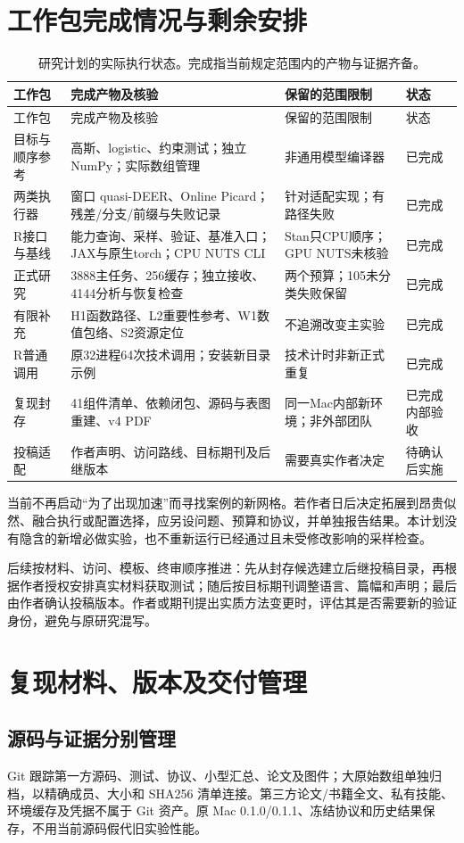 \documentclass[UTF8,zihao=-4,a4paper,fontset=fandol]{ctexart}
\begin{document}
\section{工作包完成情况与剩余安排}
\begin{longtable}{P{24mm}P{57mm}P{39mm}P{25mm}}
\caption{研究计划的实际执行状态。完成指当前规定范围内的产物与证据齐备。}\\
\toprule 工作包 & 完成产物及核验 & 保留的范围限制 & 状态\\\midrule\endfirsthead
\toprule 工作包 & 完成产物及核验 & 保留的范围限制 & 状态\\\midrule\endhead
目标与顺序参考 & 高斯、logistic、约束测试；独立 NumPy；实际数组管理 & 非通用模型编译器 & 已完成\\
两类执行器 & 窗口 quasi-DEER、Online Picard；残差/分支/前缀与失败记录 & 针对适配实现；有路径失败 & 已完成\\
R接口与基线 & 能力查询、采样、验证、基准入口；JAX与原生torch；CPU NUTS CLI & Stan只CPU顺序；GPU NUTS未核验 & 已完成\\
正式研究 & 3888主任务、256缓存；独立接收、4144分析与恢复检查 & 两个预算；105未分类失败保留 & 已完成\\
有限补充 & H1函数路径、L2重要性参考、W1数值包络、S2资源定位 & 不追溯改变主实验 & 已完成\\
R普通调用 & 原32进程64次技术调用；安装新目录示例 & 技术计时非新正式重复 & 已完成\\
复现封存 & 41组件清单、依赖闭包、源码与表图重建、v4 PDF & 同一Mac内部新环境；非外部团队 & 已完成内部验收\\
投稿适配 & 作者声明、访问路线、目标期刊及后继版本 & 需要真实作者决定 & 待确认后实施\\\bottomrule
\end{longtable}

当前不再启动“为了出现加速”而寻找案例的新网格。若作者日后决定拓展到昂贵似然、融合执行或配置选择，应另设问题、预算和协议，并单独报告结果。本计划没有隐含的新增必做实验，也不重新运行已经通过且未受修改影响的采样检查。

后续按材料、访问、模板、终审顺序推进：先从封存候选建立后继投稿目录，再根据作者授权安排真实材料获取测试；随后按目标期刊调整语言、篇幅和声明；最后由作者确认投稿版本。作者或期刊提出实质方法变更时，评估其是否需要新的验证身份，避免与原研究混写。

\section{复现材料、版本及交付管理}
\subsection{源码与证据分别管理}
Git 跟踪第一方源码、测试、协议、小型汇总、论文及图件；大原始数组单独归档，以精确成员、大小和 SHA256 清单连接。第三方论文/书籍全文、私有技能、环境缓存及凭据不属于 Git 资产。原 Mac 0.1.0/0.1.1、冻结协议和历史结果保存，不用当前源码假代旧实验性能。
\end{document}
